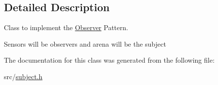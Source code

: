 \subsection{Detailed Description}
Class to implement the \hyperlink{classObserver}{Observer} Pattern. 

Sensors will be observers and arena will be the subject 

The documentation for this class was generated from the following file\+:\begin{DoxyCompactItemize}
\item 
src/\hyperlink{subject_8h}{subject.\+h}\end{DoxyCompactItemize}
